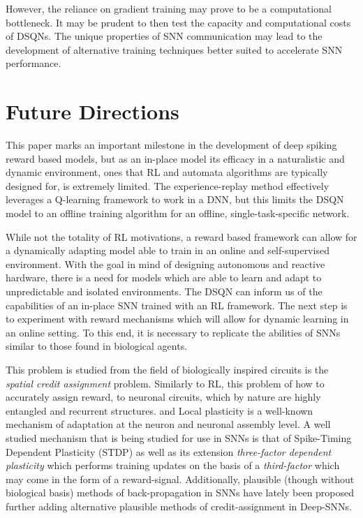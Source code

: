 \documentclass[journal,onecolumn]{IEEEtran}
\begin{document}
However, the reliance on gradient training may prove to be a
computational bottleneck. It may be prudent to then test the capacity
and computational costs of DSQNs. The unique properties of SNN
communication may lead to the development of alternative training techniques better suited to accelerate SNN performance.


\section{Future Directions}\label{furture-directions}

This paper marks an important milestone in the development of deep
spiking reward based models, but as an in-place model its efficacy in a naturalistic and dynamic environment, ones that RL and automata algorithms are typically designed for, is extremely limited. The experience-replay method effectively leverages a Q-learning
framework to work in a DNN, but this limits the DSQN model to an offline
training algorithm for an offline, single-task-specific network.

While not the totality of RL motivations, a reward based framework can
allow for a dynamically adapting model able to train in an online and
self-supervised environment. With the goal in mind of designing
autonomous and reactive hardware, there is a need for models which are
able to learn and adapt to unpredictable and isolated environments. The
DSQN can inform us of the capabilities of an in-place SNN trained with
an RL framework. The next step is to experiment with reward mechanisms
which will allow for dynamic learning in an online setting. To this end, it is necessary to replicate the abilities of SNNs similar to
those found in biological agents.

This problem is studied from the field of biologically inspired circuits is the \textit{spatial credit
assignment} problem. Similarly to RL, this problem of how to accurately assign reward, to neuronal circuits, which by nature are highly entangled and recurrent structures. and Local plasticity is a well-known mechanism of adaptation at
the neuron and neuronal assembly level. A well studied mechanism that is
being studied for use in SNNs is that of Spike-Timing Dependent
Plasticity (STDP) as well as its extension \emph{three-factor dependent
plasticity} which performs training updates on the basis of a
\emph{third-factor} which may come in the form of a reward-signal.
Additionally, plausible (though without biological basis) methods of back-propagation in SNNs have lately been proposed \autocite{payeurBurstdependentSynapticPlasticity2021}
\autocite{williamsNeuralBurstCodes2021} further adding alternative
plausible methods of credit-assignment in Deep-SNNs.
\end{document}
